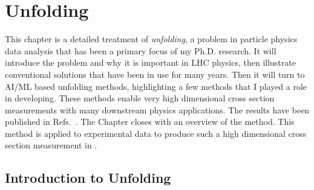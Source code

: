 
\chapter{Unfolding}
\label{ch:unfolding}

This chapter is a detailed treatment of \textit{unfolding}, a problem in particle physics data analysis that has been a primary focus of my Ph.D. research.
It will introduce the problem and why it is important in LHC physics, then illustrate conventional solutions that have been in use for many years.
Then it will turn to AI/ML based unfolding methods, highlighting a few methods that I played a role in developing.
These methods enable very high dimensional cross section measurements with many downstream physics applications.
The results have been published in Refs.~\cite{Shmakov:2023kjj,Shmakov:2024gkd,Huetsch:2024quz,Petitjean:2025tgk}.
The Chapter closes with an overview of the \Omnifold method.
This method is applied to experimental data to produce such a high dimensional cross section measurement in .

\section{Introduction to Unfolding}
\label{sec:unfolding-intro}

